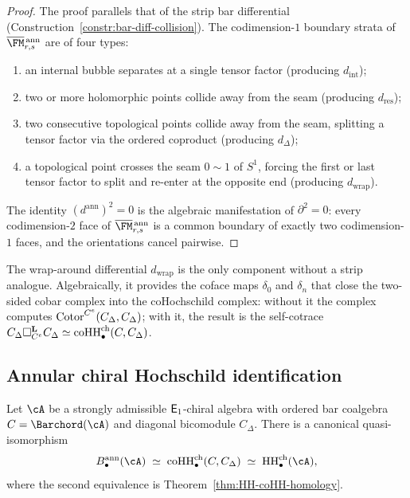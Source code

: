 \begin{proof}
The proof parallels that of the strip bar differential
(Construction~\ref{constr:bar-diff-collision}). The
codimension-$1$ boundary strata of
$\overline{\FM}{}^{\,\mathrm{ann}}_{r,s}$ are of four types:
\begin{enumerate}[label=(\roman*)]
\item an internal bubble separates at a single tensor factor
 (producing $d_{\mathrm{int}}$);
\item two or more holomorphic points collide away from the
 seam (producing $d_{\mathrm{res}}$);
\item two consecutive topological points collide away from
 the seam, splitting a tensor factor via the ordered
 coproduct (producing $d_\Delta$);
\item a topological point crosses the seam $0\sim 1$ of $S^1$,
 forcing the first or last tensor factor to split and
 re-enter at the opposite end (producing $d_{\mathrm{wrap}}$).
\end{enumerate}
The identity $(d^{\mathrm{ann}})^2=0$ is the algebraic
manifestation of $\partial^2=0$: every codimension-$2$
face of $\overline{\FM}{}^{\,\mathrm{ann}}_{r,s}$ is a
common boundary of exactly two codimension-$1$ faces, and
the orientations cancel pairwise.
\end{proof}

\begin{remark}
\label{rem:wrap-around}
The wrap-around differential $d_{\mathrm{wrap}}$ is the
only component without a strip analogue. Algebraically,
it provides the coface maps $\delta_0$ and $\delta_n$ that
close the two-sided cobar complex into the coHochschild
complex: without it the complex computes
$\operatorname{Cotor}^{C^e}(C_\Delta,C_\Delta)$; with it, the
result is the self-cotrace
$C_\Delta\square_{C^e}^{\mathbf{L}}
C_\Delta\simeq
\operatorname{coHH}^{\mathrm{ch}}_\bullet(C,C_\Delta)$.
\end{remark}

\subsection{Annular chiral Hochschild identification}

\begin{theorem}%
\label{thm:annular-HH}%
%
%
Let $\cA$ be a strongly admissible $\mathsf{E}_1$-chiral
algebra with ordered bar coalgebra $C=\Barchord(\cA)$
and diagonal bicomodule $C_\Delta$.
There is a canonical quasi-isomorphism
\[
B^{\mathrm{ann}}_\bullet(\cA)
\;\simeq\;
\coHoch^{\mathrm{ch}}_\bullet(C,C_\Delta)
\;\simeq\;
\HH^{\mathrm{ch}}_\bullet(\cA),
\]
where the second equivalence is
Theorem~\textup{\ref{thm:HH-coHH-homology}}.
\end{theorem}

